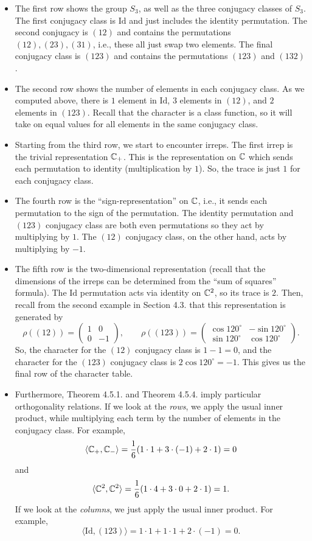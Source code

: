 \documentclass[oneside]{scrbook}
\newcommand{\Id}{\text{Id}}
\begin{document}
\begin{itemize}
    \item The first row shows the group $S_3$, as well as the three conjugacy classes of $S_3$. The first conjugacy class is $\Id$ and just includes the identity permutation. The second conjugacy is $(12)$ and contains the permutations $(12),(23),(31)$, i.e., these all just swap two elements. The final conjugacy class is $(123)$ and contains the permutations $(123)$ and $(132)$. 
    \item The second row shows the number of elements in each conjugacy class. As we computed above, there is $1$ element in $\Id$, $3$ elements in $(12)$, and $2$ elements in $(123)$. Recall that the character is a class function, so it will take on equal values for all elements in the same conjugacy class.
    \item Starting from the third row, we start to encounter irreps. The first irrep is the trivial representation $\mathbb C_+$. This is the representation on $\mathbb C$ which sends each permutation to identity (multiplication by $1$). So, the trace is just $1$ for each conjugacy class.
    \item The fourth row is the ``sign-representation'' on $\mathbb C$, i.e., it sends each permutation to the sign of the permutation. The identity permutation and $(123)$ conjugacy class are both even permutations so they act by multiplying by $1$. The $(12)$ conjugacy class, on the other hand, acts by multiplying by $-1$. 
    \item The fifth row is the two-dimensional representation (recall that the dimensions of the irreps can be determined from the ``sum of squares'' formula). The $\Id$ permutation acts via identity on $\mathbb C^2$, so its trace is $2$. Then, recall from the second example in Section 4.3. that this representation is generated by
    \[\rho((12))=\begin{pmatrix}
    1 & 0\\
    0 & -1\end{pmatrix}, \qquad \rho((123))=\begin{pmatrix}
    \cos 120^{\circ} & -\sin 120^{\circ}\\
    \sin 120^{\circ} & \cos 120^{\circ}\end{pmatrix}.\]
    So, the character for the $(12)$ conjugacy class is $1-1=0$, and the character for the $(123)$ conjugacy class is $2\cos 120^{\circ}=-1$. This gives us the final row of the character table. 
    \item Furthermore, Theorem 4.5.1. and Theorem 4.5.4. imply particular orthogonality relations. If we look at the \emph{rows}, we apply the usual inner product, while multiplying each term by the number of elements in the conjugacy class. For example,
    \[\langle \mathbb C_+,\mathbb C_-\rangle = \frac{1}{6}(1\cdot 1+3\cdot (-1)+2\cdot 1)=0\]
    and
    \[\langle \mathbb C^2,\mathbb C^2\rangle = \frac{1}{6}(1\cdot 4+3\cdot 0+2\cdot 1)=1.\]
    If we look at the \emph{columns}, we just apply the usual inner product. For example,
    \[\langle \Id, (123)\rangle = 1\cdot 1+1\cdot 1+2\cdot (-1)=0.\]
\end{itemize}
\end{document}
